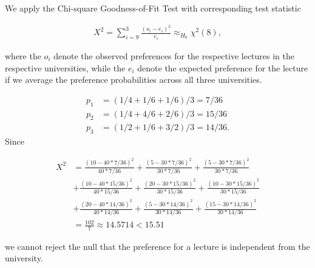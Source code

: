 \begin{solution}

We apply the Chi-square Goodness-of-Fit Test with corresponding test statistic

\begin{align*}
    X^2 = \sum_{i=9}^3 \frac{(o_i - e_i)^2}{e_i} \approx_{H_0} \chi^2(8),
\end{align*}

where the $o_i$ denote the observed preferences for the 
respective lectures in the respective universities, while the $e_i$
denote the expected preference for the lecture if we average the
preference probabilities across all three universities.

\begin{align*}
    p_1 &= (1/4 + 1/6 + 1/6)/3 = 7/36 \\
    p_2 &= (1/4 + 4/6 + 2/6)/3 = 15/36 \\
    p_3 &= (1/2 + 1/6 + 3/2)/3 = 14/36.
\end{align*}
Since

\begin{align*}
    X^2 &= \frac{(10 - 40* 7/36)^2}{40* 7/36}
    + \frac{(5 - 30* 7/36)^2}{30* 7/36}
    + \frac{(5 - 30* 7/36)^2}{30* 7/36} \\
    &+ \frac{(10 - 40* 15/36)^2}{40* 15/36}
    + \frac{(20 - 30* 15/36)^2}{30* 15/36}
    + \frac{(10 - 30* 15/36)^2}{30* 15/36} \\
    &+ \frac{(20 - 40* 14/36)^2}{40* 14/36}
    + \frac{(5 - 30* 14/36)^2}{30* 14/36}
    + \frac{(15 - 30* 14/36)^2}{30* 14/36} \\
    &= \frac{102}{7} \approx 14.5714 < 15.51
\end{align*}

we cannot reject the null that the preference for a lecture is independent
from the university.

\end{solution}

